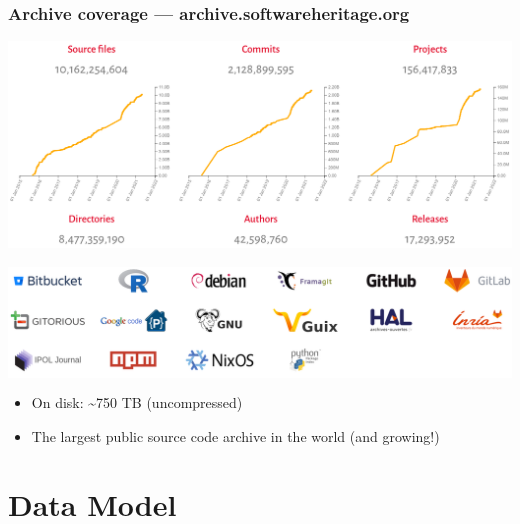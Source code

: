 \documentclass[aspectratio=169,xcolor=table]{beamer}
\begin{document}
    \begin{frame}
        \frametitle{Archive coverage --- archive.softwareheritage.org}
        \begin{center}
            \includegraphics[trim=0 2cm 0 0, clip, width=0.7\linewidth]{img/archive-growth.png}
        \end{center}
        \begin{center}
            \colorbox{white}{\includegraphics[width=0.8\linewidth]{img/archive-coverage.png}}
        \end{center}
        \vspace{-2mm}
        \begin{block}{}
            \begin{itemize}
                \item On disk: \textasciitilde{}750 TB (uncompressed)
                \item The largest public source code archive in the world (and
                    growing!)
            \end{itemize}
        \end{block}
    \end{frame}



    \section{Data Model}
\end{document}
